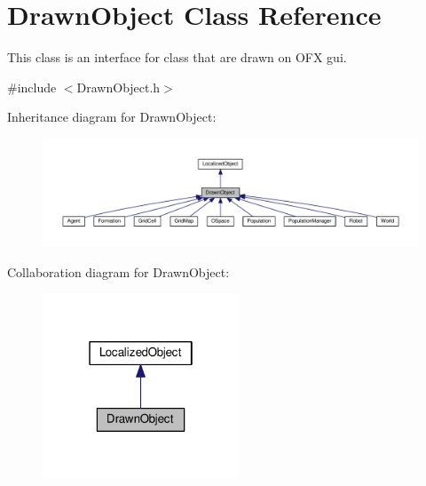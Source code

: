 \hypertarget{classDrawnObject}{}\section{Drawn\+Object Class Reference}
\label{classDrawnObject}


This class is an interface for class that are drawn on O\+FX gui.  




{\ttfamily \#include $<$Drawn\+Object.\+h$>$}



Inheritance diagram for Drawn\+Object\+:\nopagebreak
\begin{figure}[H]
\begin{center}
\leavevmode
\includegraphics[width=350pt]{classDrawnObject__inherit__graph}
\end{center}
\end{figure}


Collaboration diagram for Drawn\+Object\+:\nopagebreak
\begin{figure}[H]
\begin{center}
\leavevmode
\includegraphics[width=166pt]{classDrawnObject__coll__graph}
\end{center}
\end{figure}
